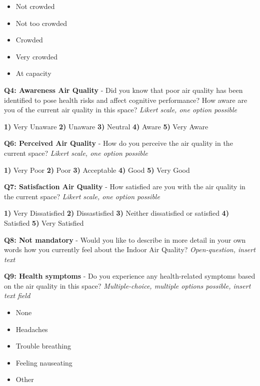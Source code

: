 \begin{appendices}
\begin{itemize}
    \item Not crowded
    \item Not too crowded
    \item Crowded
    \item Very crowded
    \item At capacity
\end{itemize}

\textbf{Q4: Awareness Air Quality} - Did you know that poor air quality has been identified to pose health risks and affect cognitive performance? How aware are you of the current air quality in this space? \textit{Likert scale, one option possible}

\textbf{1)} Very Unaware \textbf{2)} Unaware \textbf{3)} Neutral \textbf{4)} Aware \textbf{5)} Very Aware

\vspace{10pt}

\textbf{Q6: Perceived Air Quality} - How do you perceive the air quality in the current space? \textit{Likert scale, one option possible}

\textbf{1)} Very Poor \textbf{2)} Poor \textbf{3)} Acceptable \textbf{4)} Good \textbf{5)} Very Good 

\vspace{10pt}

\textbf{Q7: Satisfaction Air Quality} - How satisfied are you with the air quality in the current space? \textit{Likert scale, one option possible}

\textbf{1)} Very Dissatisfied \textbf{2)} Dissastisfied \textbf{3)} Neither dissatisfied or satisfied \textbf{4)} Satisfied \textbf{5)} Very Satisfied

\vspace{10pt}

\textbf{Q8: Not mandatory} - Would you like to describe in more detail in your own words how you currently feel about the Indoor Air Quality? \textit{Open-question, insert text}

\vspace{10pt}

\textbf{Q9: Health symptoms} - Do you experience any health-related symptoms based on the air quality in this space? \textit{Multiple-choice, multiple options possible, insert text field}

\begin{itemize}
    \item None
    \item Headaches
    \item Trouble breathing
    \item Feeling nauseating
    \item Other
\end{itemize}


\end{appendices}
